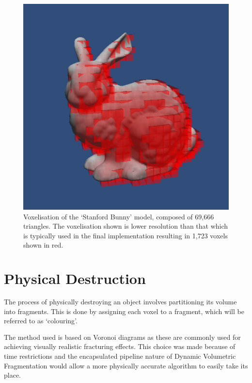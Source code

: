 \begin{figure}[b!]
\centerline{\includegraphics[scale=0.6]{Stanford_Bunny_Voxelised.png}}
\caption{Voxelisation of the `Stanford Bunny' model, composed of 69,666 triangles. The voxelisation shown is lower resolution than that which is typically used in the final implementation resulting in 1,723 voxels shown in red.}
\label{fig:3.3}
\end{figure}

\section{Physical Destruction}

\label{sect:destr}

The process of physically destroying an object involves partitioning its volume into fragments. This is done by assigning each voxel to a fragment, which will be referred to as `colouring'.

The method used is based on Voronoi diagrams as these are commonly used for achieving visually realistic fracturing effects\cite{Muller:2013:RTD:2461912.2461934}. This choice was made because of time restrictions and the encapsulated pipeline nature of Dynamic Volumetric Fragmentation would allow a more physically accurate algorithm to easily take its place.

